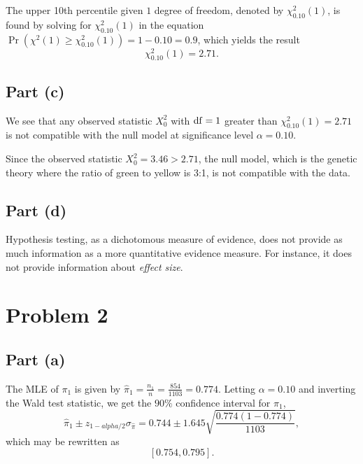 \documentclass[
]{article}
\begin{document}
The upper 10th percentile given \(1\) degree of freedom, denoted by
\(\chi_{0.10}^2(1)\), is found by solving for \(\chi_{0.10}^2(1)\) in
the equation \(\Pr(\chi^2(1) \geq \chi_{0.10}^2(1)) = 1-0.10 = 0.9\),
which yields the result \[
  \chi_{0.10}^2(1) = 2.71.
\]

\hypertarget{part-c}{%
\subsection{Part (c)}\label{part-c}}


We see that any observed statistic \(X_0^2\) with \(\rm{df}=1\) greater
than \(\chi^2_{0.10}(1) = 2.71\) is not compatible with the null model
at significance level \(\alpha = 0.10\).

Since the observed statistic \(X_0^2 = 3.46 > 2.71\), the null model,
which is the genetic theory where the ratio of green to yellow is 3:1,
is not compatible with the data.

\hypertarget{part-d}{%
\subsection{Part (d)}\label{part-d}}


Hypothesis testing, as a dichotomous measure of evidence, does not
provide as much information as a more quantitative evidence measure. For
instance, it does not provide information about \emph{effect size}.

\hypertarget{problem-2}{%
\section{Problem 2}\label{problem-2}}

\hypertarget{part-a-1}{%
\subsection{Part (a)}\label{part-a-1}}


The MLE of \(\pi_1\) is given by
\(\hat{\pi}_1 = \frac{n_1}{n} = \frac{854}{1103} = 0.774\). Letting
\(\alpha = 0.10\) and inverting the Wald test statistic, we get the
\(90\%\) confidence interval for \(\pi_1\), \[
  \hat{\pi}_1 \pm z_{1-alpha/2} \sigma_{\hat\pi} = 0.744 \pm 1.645 \sqrt{\frac{0.774(1-0.774)}{1103}},
\] which may be rewritten as \[
  [0.754, 0.795].
\]
\end{document}
